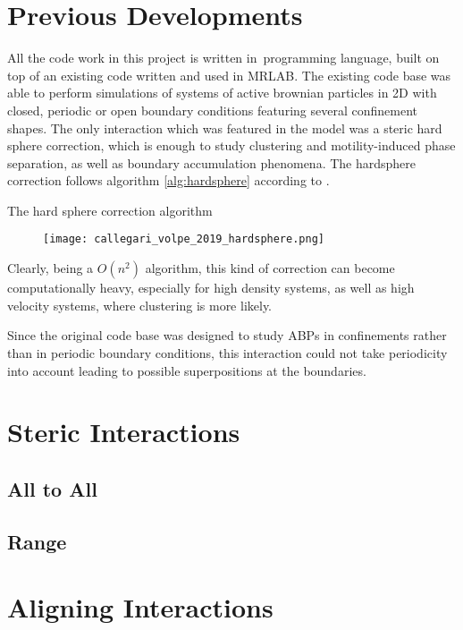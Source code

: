 \documentclass[../master_thesis_np.tex]{subfiles}
\begin{document}
	\section{Previous Developments}
	All the code work in this project is written in\ \julia programming language, built on top of an existing code written and used in {\color{blue} MRLAB}. The existing code base was able to perform simulations of systems of active brownian particles in 2D with closed, periodic or open boundary conditions featuring several confinement shapes. The only interaction which was featured in the model was a steric hard sphere correction, which is enough to study clustering and motility-induced phase  separation, as well as boundary accumulation phenomena. The hardsphere correction follows algorithm \ref{alg:hardsphere} according to \parencite{callegari_numerical_2019}.

	\begin{algorithm}[htp]
		\caption{The hard sphere correction algorithm} \label{alg:hardsphere}	
		\begin{algorithmic}[1]
			 

			\EndIf
			\EndFor
		\end{algorithmic}
		\end{algorithm}

		\begin{figure}[htp]
			\centering
			\texttt{[image: callegari\_volpe\_2019\_hardsphere.png]}
			\label{fig:hardsphere}
			\caption{{\small {}}}
		\end{figure}

	Clearly, being a $O(n^2)$ algorithm, this kind of correction can become computationally heavy, especially for high density systems, as well as high velocity systems, where clustering is more likely.
	
	Since the original code base was designed to study ABPs in confinements rather than in periodic boundary conditions, this interaction could not take periodicity into account leading to possible superpositions at the boundaries.

	\section{Steric Interactions}
	\subsection{All to All}
	\subsection{Range}
	\section{Aligning Interactions}
\end{document}
